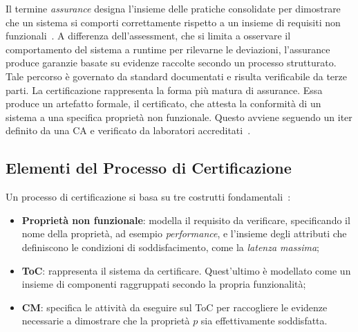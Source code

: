 Il termine \emph{assurance} designa l'insieme delle pratiche consolidate per dimostrare che
un sistema si comporti correttamente rispetto a un insieme di requisiti
non funzionali~\cite{ardagna2023manifesto}. A differenza dell'assessment, che si limita a osservare
il comportamento del sistema a runtime per rilevarne le deviazioni, l'assurance produce
garanzie basate su evidenze raccolte secondo un processo strutturato. Tale percorso è governato
da standard documentati e risulta verificabile da terze parti. La certificazione rappresenta
la forma più matura di assurance. Essa produce un artefatto formale, il certificato, che
attesta la conformità di un sistema a una specifica proprietà non funzionale. Questo avviene
seguendo un iter definito da una \gls{CA} e verificato da laboratori
accreditati~\cite{anisetti2023multidim}.

\subsection{Elementi del Processo di Certificazione}
\label{subsec:processo_certificazione}

Un processo di certificazione si basa su tre costrutti fondamentali~\cite{anisetti2023continuous}:

\begin{itemize}
  \item \textbf{Proprietà non funzionale}: modella il requisito da verificare, specificando 
      il nome della proprietà, ad esempio \emph{performance}, e l'insieme degli attributi che definiscono 
      le condizioni di soddisfacimento, come la \emph{latenza massima};
  \item \textbf{\gls{ToC}}: rappresenta il sistema da certificare. 
      Quest'ultimo è modellato come un insieme di componenti raggruppati secondo la propria funzionalità;
  \item \textbf{\gls{CM}}: specifica le attività da eseguire sul \gls{ToC} per raccogliere le
        evidenze necessarie a dimostrare che la proprietà $p$ sia effettivamente soddisfatta.
\end{itemize}

